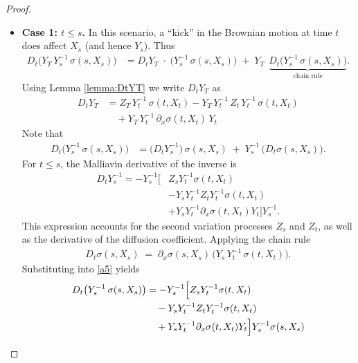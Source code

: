 \documentclass[]{interact}
\newcommand{\1}{\mathbf{1}}
\theoremstyle{plain}%
\theoremstyle{definition}
\theoremstyle{remark}
\numberwithin{equation}{section}
\begin{document}
\begin{proof}
\begin{itemize}
    \item \textbf{Case 1: \(t \leq s\).} 
    In this scenario, a “kick” in the Brownian motion at time \(t\) does 
    affect \(X_s\) (and hence \(Y_s\)). Thus
    \begin{align*}
    D_t \bigl(Y_T\,Y_s^{-1}\,\sigma(s, X_s)\bigr)
    &= 
   D_t Y_T
      \;\cdot\; 
      \bigl(Y_s^{-1}\,\sigma(s, X_s)\bigr)
    \;+\;
    Y_T \;\,\underbrace{D_t\bigl(Y_s^{-1}\,\sigma(s, X_s)\bigr)}_{\text{chain rule}}.
    \end{align*}
Using Lemma \ref{lemma:DtYT} we write $D_t Y_T$ as 
        \begin{align*}
        D_t Y_T &= Z_T\,Y_t^{-1}\,\sigma(t, X_t) - Y_T\,Y_t^{-1}\,Z_t\,Y_t^{-1}\,\sigma(t, X_t) \\
        &\quad + Y_T\,Y_t^{-1}\,\partial_x \sigma(t, X_t)\,Y_t
        \end{align*}
        Note that 
        \begin{align}
        D_t \bigl(Y_s^{-1}\,\sigma(s, X_s)\bigr)
        &= 
        \bigl(D_t Y_s^{-1}\bigr)\,\sigma(s, X_s)
          \;+\;
          Y_s^{-1}\,\bigl(D_t \sigma(s, X_s)\bigr).
          \label{a5}
        \end{align}
%
        For \( t \leq s \), the Malliavin derivative of the inverse is
        \begin{align*}
        D_t Y_s^{-1} = -Y_s^{-1} \big[ &Z_s Y_t^{-1} \sigma(t, X_t) \\
        &- Y_s Y_t^{-1} Z_t Y_t^{-1} \sigma(t, X_t) \\
        &+ Y_s Y_t^{-1} \partial_x \sigma(t, X_t) Y_t \big] Y_s^{-1}.
        \end{align*}
    This expression accounts for the second variation processes \( Z_s \) and \( Z_t \), as well as the derivative of the diffusion coefficient.
Applying the chain rule
        \begin{align*}
        D_t \sigma(s, X_s)
        \;=\;
        \partial_x \sigma(s, X_s)\,\bigl(Y_s\,Y_t^{-1}\,\sigma(t, X_t)\bigr).
        \end{align*}
        Substituting into \eqref{a5} yields
        \begin{align*}
        D_t \bigl(Y_s^{-1}\,\sigma(s, X_s)\bigr) &= - Y_s^{-1} \Bigl[ Z_s Y_t^{-1} \sigma(t, X_t) \\
        &\quad - Y_s Y_t^{-1} Z_t Y_t^{-1} \sigma(t, X_t) \\
        &\quad + Y_s Y_t^{-1} \partial_x \sigma(t, X_t) Y_t \Bigr] Y_s^{-1} \sigma(s, X_s) \\

\end{align*}
\end{itemize}
\end{proof}
\end{document}
